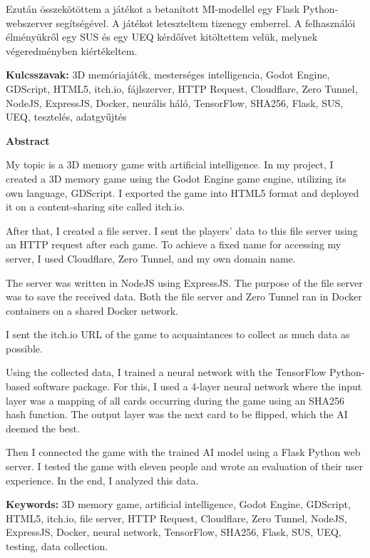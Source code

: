 Ezután összekötöttem a játékot a betanított MI-modellel egy Flask Python-webszerver segítségével. A játékot leteszteltem tizenegy emberrel. A felhasználói élményükről egy SUS és egy UEQ kérdőívet kitöltettem velük, melynek végeredményben kiértékeltem.
\vspace{8pt}



\textbf{Kulcsszavak: }3D memóriajáték, mesterséges intelligencia, Godot Engine, GDScript, HTML5, itch.io, fájlszerver, HTTP Request, Cloudflare, Zero Tunnel, NodeJS, ExpressJS, Docker, neurális háló, TensorFlow, SHA256, Flask, SUS, UEQ, tesztelés, adatgyűjtés
\newpage



\textbf{\large{Abstract}}\\[32pt]

\thispagestyle{fancy}
\pagestyle{fancy}

\vspace{8pt}

My topic is a 3D memory game with artificial intelligence. In my project, I created a 3D memory game using the Godot Engine game engine, utilizing its own language, GDScript. I exported the game into HTML5 format and deployed it on a content-sharing site called itch.io.

After that, I created a file server. I sent the players’ data to this file server using an HTTP request after each game. To achieve a fixed name for accessing my server, I used Cloudflare, Zero Tunnel, and my own domain name.

The server was written in NodeJS using ExpressJS. The purpose of the file server was to save the received data. Both the file server and Zero Tunnel ran in Docker containers on a shared Docker network.

I sent the itch.io URL of the game to acquaintances to collect as much data as possible.

Using the collected data, I trained a neural network with the TensorFlow Python-based software package. For this, I used a 4-layer neural network where the input layer was a mapping of all cards occurring during the game using an SHA256 hash function. The output layer was the next card to be flipped, which the AI deemed the best.

Then I connected the game with the trained AI model using a Flask Python web server. I tested the game with eleven people and wrote an evaluation of their user experience. In the end, I analyzed this data.
\vspace{8pt}


\textbf{Keywords: }3D memory game, artificial intelligence, Godot Engine, GDScript, HTML5, itch.io, file server, HTTP Request, Cloudflare, Zero Tunnel, NodeJS, ExpressJS, Docker, neural network, TensorFlow, SHA256, Flask, SUS, UEQ, testing, data collection.